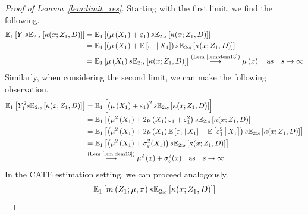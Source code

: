 \begin{proof}[Proof of Lemma~\ref{lem:limit_res}]
	Starting with the first limit, we find the following.
	\begin{equation}
		\begin{aligned}
			\mathbb{E}_{1}\left[Y_1 s \mathbb{E}_{2:s}\left[\kappa(x; Z_1, D)\right]\right]
			& = \mathbb{E}_{1}\left[\left(\mu\left(X_1\right) + \varepsilon_1\right) s \mathbb{E}_{2:s}\left[\kappa(x; Z_1, D)\right]\right]\\
			& = \mathbb{E}_{1}\left[\left(\mu\left(X_1\right) + \mathbb{E}\left[\varepsilon_1 \, \middle| \, X_1\right]\right) s \mathbb{E}_{2:s}\left[\kappa(x; Z_1, D)\right]\right]\\
			& = \mathbb{E}_{1}\left[\mu\left(X_1\right) s \mathbb{E}_{2:s}\left[\kappa(x; Z_1, D)\right]\right]
			\overset{\text{(Lem~\ref{lem:dem13})}}{\longrightarrow} \mu\left(x\right)
			\quad \text{as} \quad s \rightarrow \infty
		\end{aligned}
	\end{equation}
	Similarly, when considering the second limit, we can make the following observation.
	\begin{equation}
		\begin{aligned}
			\mathbb{E}_{1}\left[Y_1^2 s \mathbb{E}_{2:s}\left[\kappa(x; Z_1, D)\right]\right]
			& = \mathbb{E}_{1}\left[\left(\mu\left(X_1\right) + \varepsilon_1\right)^2 s \mathbb{E}_{2:s}\left[\kappa(x; Z_1, D)\right]\right]\\
			& = \mathbb{E}_{1}\left[\left(\mu^2\left(X_1\right) + 2\mu\left(X_1\right)\varepsilon_1 + \varepsilon_1^2\right)s \mathbb{E}_{2:s}\left[\kappa(x; Z_1, D)\right]\right]\\
			& = \mathbb{E}_{1}\left[\left(\mu^2\left(X_1\right) + 2\mu\left(X_1\right) \mathbb{E}\left[\varepsilon_1 \, \middle| \, X_1\right] + \mathbb{E}\left[\varepsilon_1^2 \, \middle| \, X_1\right]\right)
			s \mathbb{E}_{2:s}\left[\kappa(x; Z_1, D)\right]\right] \\
			& = \mathbb{E}_{1}\left[\left(\mu^2\left(X_1\right) +\sigma_{\varepsilon}^{2}(X_1)\right) s \mathbb{E}_{2:s}\left[\kappa(x; Z_1, D)\right]\right] \\
			& \overset{\text{(Lem~\ref{lem:dem13})}}{\longrightarrow} \mu^2\left(x\right) +\sigma_{\varepsilon}^{2}(x)
			\quad \text{as} \quad s \rightarrow \infty
		\end{aligned}
	\end{equation}
	In the CATE estimation setting, we can proceed analogously.
	\begin{equation}
		\begin{aligned}
			\E_{1}\left[m\left(Z_{1}; \mu, \pi\right) s \E_{2:s}\left[\kappa(x; Z_1, D)\right]\right]

\end{aligned}
\end{equation}
\end{proof}

